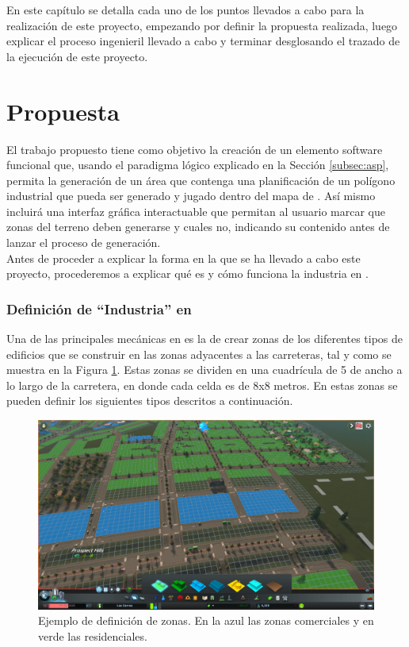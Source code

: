 En este capítulo se detalla cada uno de los puntos llevados a cabo para la realización de este proyecto, empezando por definir la propuesta realizada, luego explicar el proceso ingenieril llevado a cabo y terminar desglosando el trazado de la ejecución de este proyecto.

\section{Propuesta}

El trabajo propuesto tiene como objetivo la creación de un elemento software funcional que, usando el paradigma lógico explicado en la Sección \ref{subsec:asp}, permita la generación de un área que contenga una planificación de un polígono industrial que pueda ser generado y jugado dentro del mapa de \cities. Así mismo incluirá una interfaz gráfica interactuable que permitan al usuario marcar que zonas del terreno deben generarse y cuales no, indicando su contenido antes de lanzar el proceso de generación. \\

Antes de proceder a explicar la forma en la que se ha llevado a cabo este proyecto, procederemos a explicar qué es y cómo funciona la industria en \cities.

\subsubsection{Definición de ``Industria'' en \cities}
\label{subsubsec:industry_cities}

Una de las principales mecánicas en \cities es la de crear zonas de los diferentes tipos de edificios que se construir en las zonas adyacentes a las carreteras, tal y como se muestra en la Figura \ref{fig:zoneo}. Estas zonas se dividen en una cuadrícula de 5 de ancho a lo largo de la carretera, en donde cada celda es de 8x8 metros. En estas zonas se pueden definir los siguientes tipos descritos a continuación.

\begin{figure}[h]
	\centering
	\includegraphics[width=\textwidth]{images/zoneo}
	\caption{Ejemplo de definición de zonas. En la azul las zonas comerciales y en verde las residenciales.}
	\label{fig:zoneo}
\end{figure}


